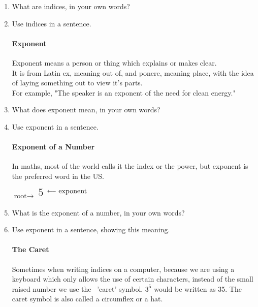 \documentclass[12pt]{article}
\begin{document}
\begin{enumerate}
\item What are indices, in your own words?
\item Use indices in  a sentence.

\paragraph{Exponent}
Exponent means a person or thing which explains or makes clear.\\

It is from Latin ex, meaning out of, and ponere, meaning place, with the idea of laying something out to view it's parts.\\

 For example, "The speaker is an exponent of the need for clean energy."\\
 
\item What does exponent mean, in your own words?
\item Use exponent in a sentence.

\paragraph{Exponent of a Number}
In maths, most of the world calls it the index or the power, but exponent is the preferred word in the US.\\

\begin{center}
$\text{root}\rightarrow$
{\fontsize{30}{34}}
$\textsuperscript{{\fontsize{15}{20}\selectfont 5} \ \raisebox{1.5ex}{$\longleftarrow$\ }}\raisebox{0.8ex}{\textsuperscript{\normalsize{\text{exponent}}}}$
\normalsize
\end{center}

\item What is the exponent of a number, in your own words?
\item Use exponent in a sentence, showing this meaning.

\paragraph{The {\fontsize{30}{34}\selectfont {\raisebox{-.8ex}{\textasciicircum}}} Caret}
Sometimes when writing indices on a computer, because we are using a keyboard which only allows the use of certain characters, instead of the small raised number we use the {\fontsize{30}{34}\selectfont {\raisebox{-.8ex}{\textasciicircum}}} \ 'caret' symbol. $3^5$ would be written as 3{\fontsize{30}{34}\selectfont {\raisebox{-.8ex}{\textasciicircum}}}5. The caret symbol is also called a circumflex or a hat.\\


\end{enumerate}
\end{document}
